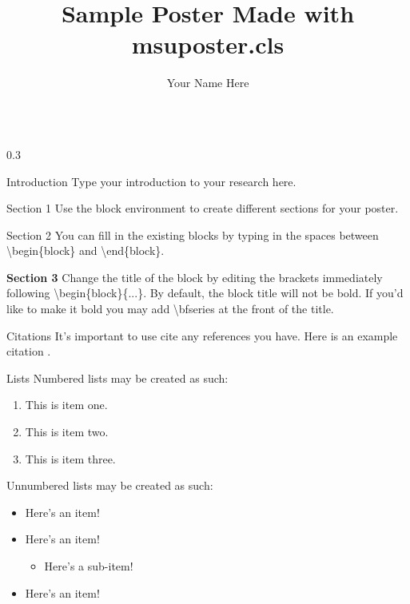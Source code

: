\documentclass{msuposter}
\title{Sample Poster Made with {\ttfamily msuposter.cls}}
\author{Your Name Here}
\institute{AMS Graduate Student Chapter}
\newcommand{\colwidth}{0.3\linewidth}
\begin{document}
\begin{frame}{}
\begin{columns}[t]

\begin{column}{\colwidth}

\begin{block}{Introduction}
Type your introduction to your research here.
\end{block}

\begin{block}{Section 1}
Use the {\ttfamily block} environment to create different sections for your poster. 
\end{block}

\begin{block}{Section 2} 
You can fill in the existing blocks by typing in the spaces between {\ttfamily\textbackslash begin\{block\}} and {\ttfamily\textbackslash end\{block\}}.\cite{NIPS2014_5ca3e9b1}
\end{block}

\begin{block}{\bfseries Section 3}
Change the title of the block by editing the brackets immediately following {\ttfamily\textbackslash begin\{block\}\{...\}}.  By default, the block title will not be bold.  If you'd like to make it bold you may add {\ttfamily \textbackslash bfseries} at the front of the title.
\end{block}

\begin{block}{Citations}
It's important to use cite any references you have.  Here is an example citation \cite{cite1}.
\end{block}

\begin{block}{Lists}
Numbered lists may be created as such:
\begin{enumerate}
  \item This is item one.
  \item This is item two.
  \item This is item three.
\end{enumerate}

Unnumbered lists may be created as such:
\begin{itemize}
  \item Here's an item!
  \item Here's an item!
  \begin{itemize}
    \item Here's a sub-item!
  \end{itemize}
  \item Here's an item!
\end{itemize}
\end{block}


\end{column}
\end{columns}
\end{frame}
\end{document}
